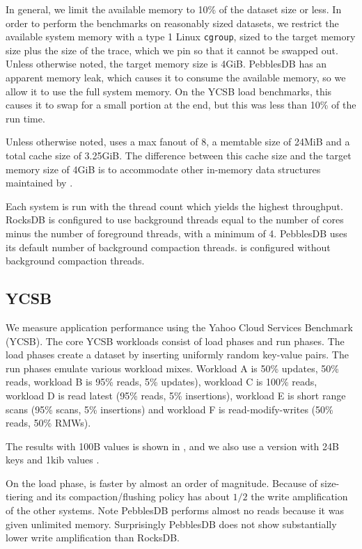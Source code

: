In general, we limit the available memory to 10\% of the dataset size or less.
In order to perform the benchmarks on reasonably sized datasets, we restrict
the available system memory with a type 1 Linux \texttt{cgroup}, sized to the
target memory size plus the size of the trace, which we pin so that it cannot
be swapped out. Unless otherwise noted, the target memory size is 4GiB.
PebblesDB has an apparent memory leak, which causes it to consume the available
memory, so we allow it to use the full system memory. On the YCSB load
benchmarks, this causes it to swap for a small portion at the end, but this was
less than 10\% of the  run time.

Unless otherwise noted, \sysname{} uses a max fanout of 8, a memtable size of
24MiB and a total cache size of 3.25GiB. The difference between this cache size
and the target memory size of 4GiB is to accommodate other in-memory data
structures maintained by \sysname.

Each system is run with the thread count which yields the highest throughput.
RocksDB is configured to use background threads equal to the number of cores
minus the number of foreground threads, with a minimum of 4. PebblesDB uses its
default number of background compaction threads. \sysname is configured without
background compaction threads.

\subsection{YCSB}\label{sec:ycsb}

We measure application performance using the Yahoo Cloud Services Benchmark
(YCSB). The core YCSB workloads consist of load phases and run phases.
The load phases create a dataset by inserting uniformly random
key-value pairs. 
The run phases emulate various workload mixes. Workload A is 
50\% updates, 50\% reads, workload B is 95\% reads, 5\%
updates), workload C is 100\% reads, workload D is read latest (95\%
reads, 5\% insertions), workload E is short range scans (95\% scans, 5\% insertions)
and workload F is read-modify-writes (50\% reads, 50\% RMWs).

The results with 100B values is shown in 
 , and we also use a version
with 24B keys and 1kib values .  

On the load phase, \sysname is faster by almost an order of magnitude.  Because
of size-tiering and its compaction/flushing policy \sysname has about $1/2$ the
write amplification of the other systems. Note PebblesDB performs almost no
reads because it was given unlimited memory.  Surprisingly PebblesDB does not
show substantially lower write amplification than RocksDB.


